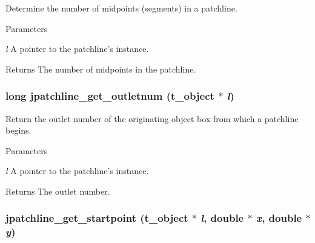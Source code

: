 Determine the number of midpoints (segments) in a patchline. 
\begin{DoxyParams}{Parameters}
\item[{\em l}]A pointer to the patchline's instance. \end{DoxyParams}
\begin{DoxyReturn}{Returns}
The number of midpoints in the patchline. 
\end{DoxyReturn}
\hypertarget{group__jpatchline_ga901d26a483f28768c842defe9ad06cfb}{
\subsubsection[{jpatchline\_\-get\_\-outletnum}]{\setlength{\rightskip}{0pt plus 5cm}long jpatchline\_\-get\_\-outletnum ({\bf t\_\-object} $\ast$ {\em l})}}
\label{group__jpatchline_ga901d26a483f28768c842defe9ad06cfb}


Return the outlet number of the originating object box from which a patchline begins. 
\begin{DoxyParams}{Parameters}
\item[{\em l}]A pointer to the patchline's instance. \end{DoxyParams}
\begin{DoxyReturn}{Returns}
The outlet number. 
\end{DoxyReturn}
\hypertarget{group__jpatchline_ga22e58d4f810941cbcab9c72fd6f944a8}{
\subsubsection[{jpatchline\_\-get\_\-startpoint}]{ jpatchline\_\-get\_\-startpoint ({\bf t\_\-object} $\ast$ {\em l}, \/  double $\ast$ {\em x}, \/  double $\ast$ {\em y})}}
\label{group__jpatchline_ga22e58d4f810941cbcab9c72fd6f944a8}


